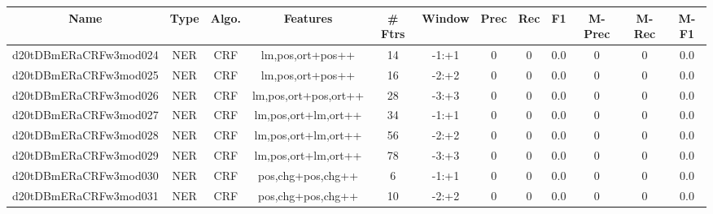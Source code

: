 \documentclass[a4paper]{article}
\begin{document}
\begin{landscape}
\begin{center}
\begin{tabular}{ |c|c|c|c|c|c|c|c|c|c|c|c|} 
 \hline
 	Name & Type & Algo. & Features & \# Ftrs & Window & Prec & Rec & F1 & M-Prec & M-Rec & M-F1\\
 \hline

 	

 
 	
 	\small{ d20tDBmERaCRFw3mod024 } & \small{ NER} & \small{  CRF }  & lm,pos,ort+pos++  &  14 &  \small{  -1:+1 }  &  0 & 0 & 0.0  &  0 & 0 & 0.0 \\
 	

 
 	
 	\small{ d20tDBmERaCRFw3mod025 } & \small{ NER} & \small{  CRF }  & lm,pos,ort+pos++  &  16 &  \small{  -2:+2 }  &  0 & 0 & 0.0  &  0 & 0 & 0.0 \\
 	

 
 	
 	\small{ d20tDBmERaCRFw3mod026 } & \small{ NER} & \small{  CRF }  & lm,pos,ort+pos,ort++  &  28 &  \small{  -3:+3 }  &  0 & 0 & 0.0  &  0 & 0 & 0.0 \\
 	

 
 	
 	\small{ d20tDBmERaCRFw3mod027 } & \small{ NER} & \small{  CRF }  & lm,pos,ort+lm,ort++  &  34 &  \small{  -1:+1 }  &  0 & 0 & 0.0  &  0 & 0 & 0.0 \\
 	

 
 	
 	\small{ d20tDBmERaCRFw3mod028 } & \small{ NER} & \small{  CRF }  & lm,pos,ort+lm,ort++  &  56 &  \small{  -2:+2 }  &  0 & 0 & 0.0  &  0 & 0 & 0.0 \\
 	

 
 	
 	\small{ d20tDBmERaCRFw3mod029 } & \small{ NER} & \small{  CRF }  & lm,pos,ort+lm,ort++  &  78 &  \small{  -3:+3 }  &  0 & 0 & 0.0  &  0 & 0 & 0.0 \\
 	

 
 	
 	\small{ d20tDBmERaCRFw3mod030 } & \small{ NER} & \small{  CRF }  & pos,chg+pos,chg++  &  6 &  \small{  -1:+1 }  &  0 & 0 & 0.0  &  0 & 0 & 0.0 \\
 	

 
 	
 	\small{ d20tDBmERaCRFw3mod031 } & \small{ NER} & \small{  CRF }  & pos,chg+pos,chg++  &  10 &  \small{  -2:+2 }  &  0 & 0 & 0.0  &  0 & 0 & 0.0 \\
 	


\end{tabular}
\end{center}
\end{landscape}
\end{document}

